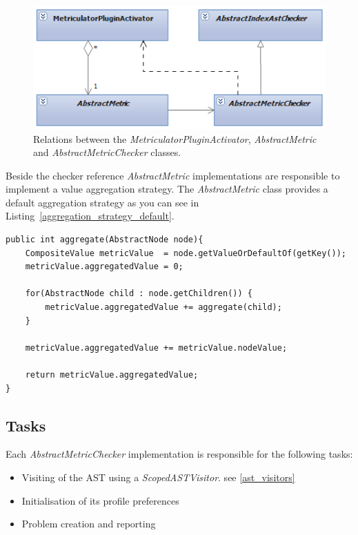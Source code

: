 \documentclass[11pt,a4paper,oneside]{scrreprt}
\begin{document}
\begin{figure}[th]
\begin{center}
\includegraphics[]{figures/metriculator_checker.png}
\end{center}
\caption{Relations between the \textit{MetriculatorPluginActivator}, \textit{AbstractMetric} and \textit{AbstractMetricChecker} classes.}
\label{fig:metriculator_checker}
\end{figure}

Beside the checker reference \textit{AbstractMetric} implementations are responsible to implement a value aggregation strategy. The \textit{AbstractMetric} class provides a default aggregation strategy as you can see in Listing~\ref{aggregation_strategy_default}.

\begin{lstlisting}[style=C++0x, caption=Code snippet of the default value aggregation strategy implemented in \textit{AbstractMetric}, label=aggregation_strategy_default] 
public int aggregate(AbstractNode node){
	CompositeValue metricValue  = node.getValueOrDefaultOf(getKey());
	metricValue.aggregatedValue = 0;

	for(AbstractNode child : node.getChildren()) {
		metricValue.aggregatedValue += aggregate(child);
	}

	metricValue.aggregatedValue += metricValue.nodeValue;

	return metricValue.aggregatedValue;		
}
\end{lstlisting}

\subsection{Tasks}
Each \textit{AbstractMetricChecker} implementation is responsible for the following tasks:
\begin{itemize}
\item Visiting of the AST using a \textit{ScopedASTVisitor}. see \ref{ast_visitors}
\item Initialisation of its profile preferences
\item Problem creation and reporting
\end{itemize}
\end{document}
